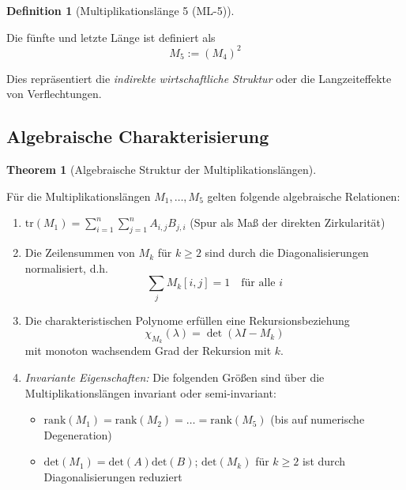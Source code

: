\documentclass[a4paper,12pt]{article}
\theoremstyle{definition}
\newtheorem{definition}{Definition}
\newtheorem{theorem}{Theorem}
\begin{document}
\begin{definition}[Multiplikationslänge 5 (ML-5)]
\label{def:ml5}

Die fünfte und letzte Länge ist definiert als
\[
M_5 := (M_4)^2
\]

Dies repräsentiert die \emph{indirekte wirtschaftliche Struktur} oder die Langzeiteffekte von Verflechtungen.
\end{definition}

\subsection{Algebraische Charakterisierung}

\begin{theorem}[Algebraische Struktur der Multiplikationslängen]
\label{thm:algebraische_struktur}

Für die Multiplikationslängen $M_1, \ldots, M_5$ gelten folgende algebraische Relationen:

\begin{enumerate}
\item $\mathrm{tr}(M_1) = \sum_{i=1}^n \sum_{j=1}^n A_{i,j} B_{j,i}$ (Spur als Maß der direkten Zirkularität)

\item Die Zeilensummen von $M_k$ für $k \geq 2$ sind durch die Diagonalisierungen normalisiert, d.h.
\[
\sum_j M_{k}[i,j] = 1 \quad \text{für alle } i
\]

\item Die charakteristischen Polynome erfüllen eine Rekursionsbeziehung
\[
\chi_{M_k}(\lambda) = \det(\lambda I - M_k)
\]
mit monoton wachsendem Grad der Rekursion mit $k$.

\item \emph{Invariante Eigenschaften:} Die folgenden Größen sind über die Multiplikationslängen invariant oder semi-invariant:
\begin{itemize}
\item $\mathrm{rank}(M_1) = \mathrm{rank}(M_2) = \ldots = \mathrm{rank}(M_5)$ (bis auf numerische Degeneration)
\item $\mathrm{det}(M_1) = \mathrm{det}(A) \mathrm{det}(B)$; $\mathrm{det}(M_k)$ für $k \geq 2$ ist durch Diagonalisierungen reduziert
\end{itemize}
\end{enumerate}

\end{theorem}
\end{document}
